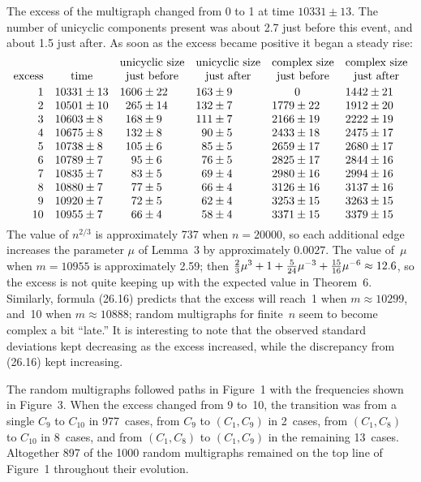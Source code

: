 The excess of the multigraph changed from 0 to 1 at time $10331\pm13$. The
number of unicyclic components present was about 2.7 just before this event,
and about 1.5 just after. As soon as the excess became positive it began a steady rise:
$$\vcenter{\halign{\hfil#&&\quad\hfil#&${}\pm#$\hfil\cr
&&\omit&\multispan2\quad\hfil unicyclic size\hfil&
\multispan2\quad\hfil unicyclic size\hfil&
\multispan2\quad\hfil complex size\hfil&
\multispan2\quad\hfil complex size\hfil\cr
excess&\multispan2\quad\hfil time\hfil&
\multispan2\quad\hfil just before\hfil&
\multispan2\quad\hfil just after\hfil&
\multispan2\quad\hfil just before\hfil&
\multispan2\quad\hfil just after\hfil\cr
\noalign{\vskip2pt}
1&10331&13&1606&22&163&9&&\omit0\hfil&1442&21\cr
2&10501&10&265&14&132&7&1779&22&1912&20\cr
3&10603&8&168&9&111&7&2166&19&2222&19\cr
4&10675&8&132&8&90&5&2433&18&2475&17\cr
5&10738&8&105&6&85&5&2659&17&2680&17\cr
6&10789&7&95&6&76&5&2825&17&2844&16\cr
7&10835&7&83&5&69&4&2980&16&2994&16\cr
8&10880&7&77&5&66&4&3126&16&3137&16\cr
9&10920&7&72&5&62&4&3253&15&3263&15\cr
10&10955&7&66&4&58&4&3371&15&3379&15\cr}}$$
The value of $n^{2/3}$ is approximately
737 when $n=20000$, so each additional edge increases
the parameter $\mu$ of Lemma~3 by approximately $0.0027$. The value of~$\mu$
when $m=10955$ is approximately 2.59; then ${2\over3}\mu^3+1+{5\over24}\mu^{-3}
+{15\over16}\mu^{-6}\approx12.6$, so the excess is not quite keeping up
with the expected value in Theorem~6. 
Similarly, formula (26.16) predicts that the excess will reach~1 when
$m\approx 10299$, and~10 when $m\approx 10888$; random multigraphs for
finite~$n$ seem to become complex a bit ``late.''
It is interesting to note that the
observed standard deviations kept decreasing as the excess increased,
while the discrepancy from (26.16) kept increasing.

\vfill\eject %

The random 
multigraphs followed paths in Figure~1 with the frequencies shown in
Figure~3. 
When the excess changed from 9 to~10, the transition was from a
single $C_9$ 
to $C_{10}$ in 977~cases, from $C_9$ to $(C_1,C_9)$ in 2~cases,
from $(C_1,C_8)$ to $C_{10}$ in 8~cases, and from $(C_1,C_8)$ to
$(C_1,C_9)$ 
in the remaining 13~cases. Altogether 897 of the 1000 random
multigraphs remained
 on the top line of Figure~1 throughout their evolution.


